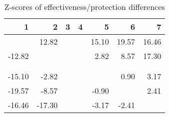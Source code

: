 \begin{table}[ht]
\centering
\begin{tabular}{rrrrrrr}
  \hline
1 & 2 & 3 & 4 & 5 & 6 & 7 \\ 
  \hline
 & 12.82 &  &  & 15.10 & 19.57 & 16.46 \\ 
  -12.82 &  &  &  & 2.82 & 8.57 & 17.30 \\ 
   &  &  &  &  &  &  \\ 
   &  &  &  &  &  &  \\ 
  -15.10 & -2.82 &  &  &  & 0.90 & 3.17 \\ 
  -19.57 & -8.57 &  &  & -0.90 &  & 2.41 \\ 
  -16.46 & -17.30 &  &  & -3.17 & -2.41 &  \\ 
   \hline
\end{tabular}
\caption{Z-scores of effectiveness/protection differences} 
\end{table}

